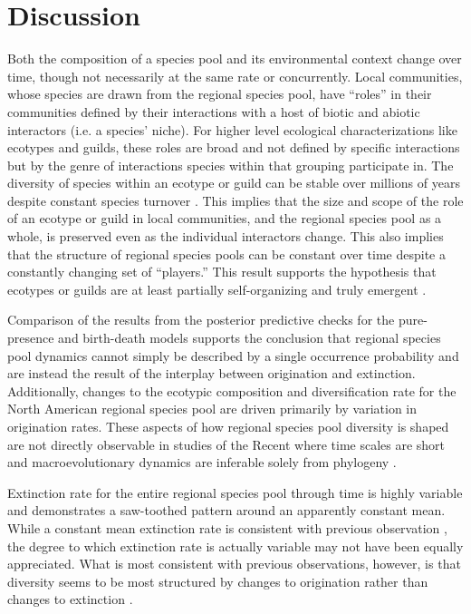 \documentclass[12pt,letterpaper]{article}
\begin{document}
\section*{Discussion}

Both the composition of a species pool and its environmental context change over time, though not necessarily at the same rate or concurrently. Local communities, whose species are drawn from the regional species pool, have ``roles'' in their communities defined by their interactions with a host of biotic and abiotic interactors (i.e. a species' niche). For higher level ecological characterizations like ecotypes and guilds, these roles are broad and not defined by specific interactions but by the genre of interactions species within that grouping participate in. The diversity of species within an ecotype or guild can be stable over millions of years despite constant species turnover \citep{Jernvall2004,Slater2015c,Valkenburgh1999}. This implies that the size and scope of the role of an ecotype or guild in local communities, and the regional species pool as a whole, is preserved even as the individual interactors change. This also implies that the structure of regional species pools can be constant over time despite a constantly changing set of ``players.'' This result supports the hypothesis that ecotypes or guilds are at least partially self-organizing and truly emergent \citep{Scheffer2006a}.

Comparison of the results from the posterior predictive checks for the pure-presence and birth-death models supports the conclusion that regional species pool dynamics cannot simply be described by a single occurrence probability and are instead the result of the interplay between origination and extinction. Additionally, changes to the ecotypic composition and diversification rate for the North American regional species pool are driven primarily by variation in origination rates. These aspects of how regional species pool diversity is shaped are not directly observable in studies of the Recent where time scales are short and macroevolutionary dynamics are inferable solely from phylogeny \citep{Fritz2013a}.

Extinction rate for the entire regional species pool through time is highly variable and demonstrates a saw-toothed pattern around an apparently constant mean. While a constant mean extinction rate is consistent with previous observation \citep{Alroy1996a,Alroy2000g}, the degree to which extinction rate is actually variable may not have been equally appreciated. What is most consistent with previous observations, however, is that diversity seems to be most structured by changes to origination rather than changes to extinction \citep{Alroy1996a,Alroy2000g}.
\end{document}
